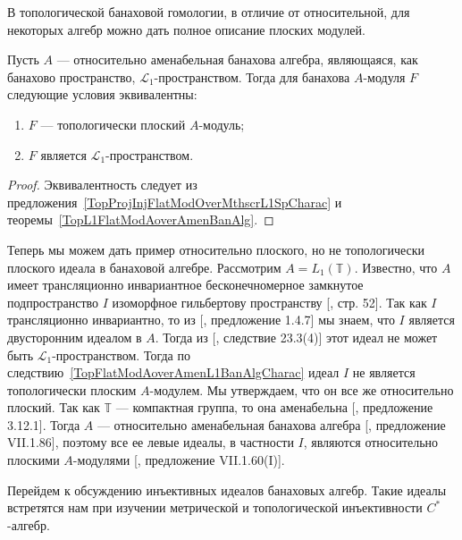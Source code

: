 В топологической банаховой гомологии, в отличие от относительной, для некоторых
алгебр можно дать полное описание плоских модулей.

\begin{corollary}\label{TopFlatModAoverAmenL1BanAlgCharac} Пусть $A$ ---
относительно аменабельная банахова алгебра, являющаяся, как банахово
пространство, $\mathscr{L}_1$-пространством. Тогда для банахова $A$-модуля $F$
следующие условия эквивалентны:
\begin{enumerate}[label = (\roman*)]
    \item $F$ --- топологически плоский $A$-модуль; 

    \item $F$ является $\mathscr{L}_1$-пространством.
\end{enumerate}
\end{corollary}
\begin{proof} Эквивалентность следует из
предложения~\ref{TopProjInjFlatModOverMthscrL1SpCharac} и
теоремы~\ref{TopL1FlatModAoverAmenBanAlg}.
\end{proof}

Теперь мы можем дать пример относительно плоского, но не топологически плоского
идеала в банаховой алгебре. Рассмотрим $A=L_1(\mathbb{T})$. Известно, что $A$
имеет трансляционно инвариантное бесконечномерное замкнутое подпространство $I$
изоморфное гильбертову пространству [\cite{RosProjTransInvSbspLpG}, стр. 52].
Так как $I$ трансляционно инвариантно, то из [\cite{KaniBanAlg}, предложение
1.4.7] мы знаем, что $I$ является двусторонним идеалом в $A$. Тогда из
[\cite{DefFloTensNorOpId}, следствие 23.3(4)] этот идеал не может быть
$\mathscr{L}_1$-пространством. Тогда по
следствию~\ref{TopFlatModAoverAmenL1BanAlgCharac} идеал $I$ не является
топологически плоским $A$-модулем. Мы утверждаем, что он все же относительно
плоский. Так как $\mathbb{T}$ --- компактная группа, то она аменабельна
[\cite{PierAmenLCA}, предложение 3.12.1]. Тогда $A$ --- относительно
аменабельная банахова алгебра [\cite{HelBanLocConvAlg}, предложение VII.1.86],
поэтому все ее левые идеалы, в частности $I$, являются относительно плоскими
$A$-модулями [\cite{HelBanLocConvAlg}, предложение VII.1.60(I)].

Перейдем к обсуждению инъективных идеалов банаховых алгебр. Такие идеалы
встретятся нам при изучении метрической и топологической инъективности
$C^*$-алгебр.

